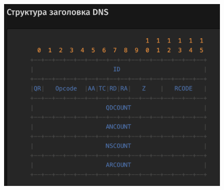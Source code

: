 \documentclass[12pt,onecolumn]{article}
\begin{document}
\begin{figure}[H]
    \centering
    \includegraphics*[width=\textwidth]{image/part10/dns-header.png}
\end{figure}
\end{document}
